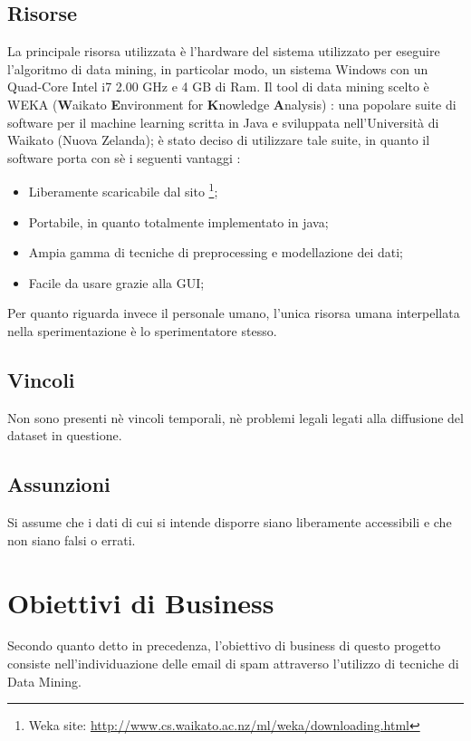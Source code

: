 \subsection{Risorse}
La principale risorsa utilizzata è l'hardware del sistema utilizzato per eseguire l'algoritmo di data mining, in particolar modo, un sistema Windows con un Quad-Core Intel i7 2.00 GHz e 4 GB di Ram.
Il tool di data mining scelto è WEKA (\textbf{W}aikato \textbf{E}nvironment for \textbf{K}nowledge \textbf{A}nalysis) \cite{WEKA}:
una popolare suite di software per il machine learning scritta in Java e sviluppata nell'Università di Waikato (Nuova Zelanda); è stato deciso di utilizzare tale suite, in quanto il software porta con sè i seguenti vantaggi :
\begin{itemize}
	\item Liberamente scaricabile dal sito \footnote{Weka site: \url{http://www.cs.waikato.ac.nz/ml/weka/downloading.html}};
    \item Portabile, in quanto totalmente implementato in java;
    \item Ampia gamma di tecniche di preprocessing e modellazione dei dati;
    \item Facile da usare grazie alla GUI;
\end{itemize}

Per quanto riguarda invece il personale umano, l'unica risorsa umana interpellata nella sperimentazione è lo sperimentatore stesso.

\subsection{Vincoli}
	Non sono presenti nè vincoli temporali, nè problemi legali legati alla diffusione del dataset in questione.

\subsection{Assunzioni}
	Si assume che i dati di cui si intende disporre siano liberamente accessibili e che non siano falsi o errati.

\section{Obiettivi di Business}
	Secondo quanto detto in precedenza, l'obiettivo di business di questo progetto consiste nell'individuazione delle email di spam attraverso l'utilizzo di tecniche di Data Mining.

